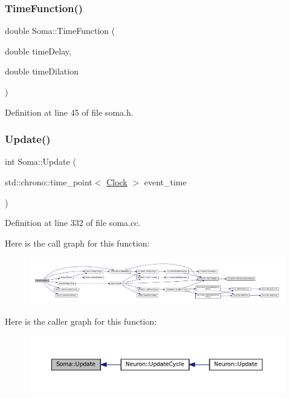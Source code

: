 \subsubsection{\texorpdfstring{Time\+Function()}{TimeFunction()}}
{\footnotesize\ttfamily double Soma\+::\+Time\+Function (\begin{DoxyParamCaption}\item[{double}]{time\+Delay,  }\item[{double}]{time\+Dilation }\end{DoxyParamCaption})\hspace{0.3cm}{\ttfamily [inline]}}



Definition at line 45 of file soma.\+h.

\mbox{\label{class_soma_a211587ef21a7932c2f8f0345b1d32f57}} 
\subsubsection{\texorpdfstring{Update()}{Update()}}
{\footnotesize\ttfamily int Soma\+::\+Update (\begin{DoxyParamCaption}\item[{std\+::chrono\+::time\+\_\+point$<$ \mbox{\hyperlink{universe_8h_a0ef8d951d1ca5ab3cfaf7ab4c7a6fd80}{Clock}} $>$}]{event\+\_\+time }\end{DoxyParamCaption})}



Definition at line 332 of file soma.\+cc.

Here is the call graph for this function\+:\nopagebreak
\begin{figure}[H]
\begin{center}
\leavevmode
\includegraphics[width=350pt]{class_soma_a211587ef21a7932c2f8f0345b1d32f57_cgraph}
\end{center}
\end{figure}
Here is the caller graph for this function\+:\nopagebreak
\begin{figure}[H]
\begin{center}
\leavevmode
\includegraphics[width=350pt]{class_soma_a211587ef21a7932c2f8f0345b1d32f57_icgraph}
\end{center}
\end{figure}


